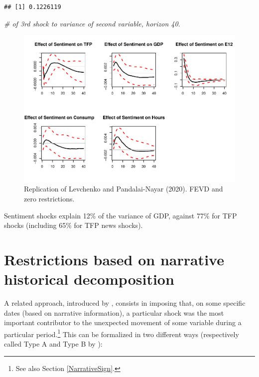 \documentclass[
  12pt,
]{book}
\newenvironment{Shaded}{\begin{snugshade}}{\end{snugshade}}
\newcommand{\CommentTok}[1]{\textcolor[rgb]{0.56,0.35,0.01}{\textit{#1}}}
\theoremstyle{definition}
\theoremstyle{definition}
\theoremstyle{definition}
\theoremstyle{definition}
\theoremstyle{remark}
\begin{document}
\begin{verbatim}
## [1] 0.1226119
\end{verbatim}

\begin{Shaded}
\begin{Highlighting}[]
\CommentTok{\# of 3rd shock to variance of second variable, horizon 40.}
\end{Highlighting}
\end{Shaded}

\begin{figure}
\includegraphics[width=0.95\linewidth]{IdentifStructShocks_files/figure-latex/levchenko-3} \caption{Replication of Levchenko and Pandalai-Nayar (2020). FEVD and zero restrictions.}\label{fig:levchenko-3}
\end{figure}

Sentiment shocks explain 12\% of the variance of GDP, against 77\% for TFP shocks (including 65\% for TFP news shocks).

\section{Restrictions based on narrative historical decomposition}\label{NarrativeHistDecomp}

A related approach, introduced by \citet{AntolinDiaz_RubioRamirez_2018}, consists in imposing that, on some specific dates (based on narrative information), a particular shock was the most important contributor to the unexpected movement of some variable during a particular period.\footnote{See also Section \ref{NarrativeSign}.} This can be formalized in two different ways (respectively called Type A and Type B by \citet{AntolinDiaz_RubioRamirez_2018}):
\end{document}
